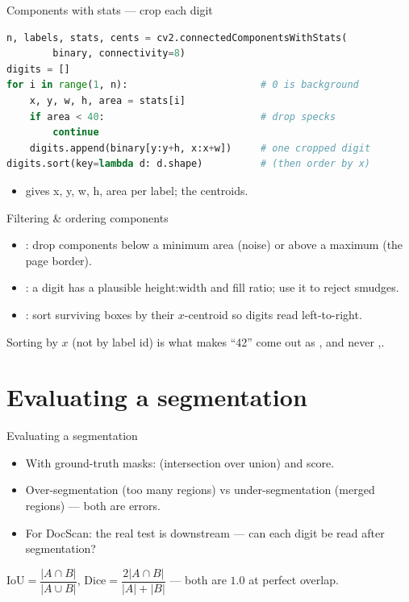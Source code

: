 \documentclass[10pt,aspectratio=169]{beamer}
\begin{document}
\begin{frame}[fragile]{Components with stats --- crop each digit}
\begin{lstlisting}[language=Python]
n, labels, stats, cents = cv2.connectedComponentsWithStats(
        binary, connectivity=8)
digits = []
for i in range(1, n):                       # 0 is background
    x, y, w, h, area = stats[i]
    if area < 40:                           # drop specks
        continue
    digits.append(binary[y:y+h, x:x+w])     # one cropped digit
digits.sort(key=lambda d: d.shape)          # (then order by x)
\end{lstlisting}
  \begin{itemize}
    \item {} gives x, y, w, h, area per label;  the centroids.
  \end{itemize}
\end{frame}

\begin{frame}{Filtering \& ordering components}
  \begin{itemize}
    \item {}: drop components below a minimum area (noise) or above a
          maximum (the page border).
    \item {}: a digit has a plausible height:width and fill ratio; use it
          to reject smudges.
    \item {}: sort surviving boxes by their $x$-centroid so digits read left-to-right.
  \end{itemize}
  \begin{goodbox}
    Sorting by $x$ (not by label id) is what makes ``42'' come out as ,
    and never ,.
  \end{goodbox}
\end{frame}

\section{Evaluating a segmentation}

\begin{frame}{Evaluating a segmentation}
  \begin{itemize}
    \item With ground-truth masks:  (intersection over union) and  score.
    \item Over-segmentation (too many regions) vs under-segmentation (merged regions) --- both are errors.
    \item For DocScan: the real test is downstream --- can each digit be read after segmentation?
  \end{itemize}
  \begin{mathbox}
    $\mathrm{IoU}=\dfrac{|A\cap B|}{|A\cup B|}$, \quad
    $\mathrm{Dice}=\dfrac{2|A\cap B|}{|A|+|B|}$ --- both are $1.0$ at perfect overlap.
  \end{mathbox}
\end{frame}
\end{document}
